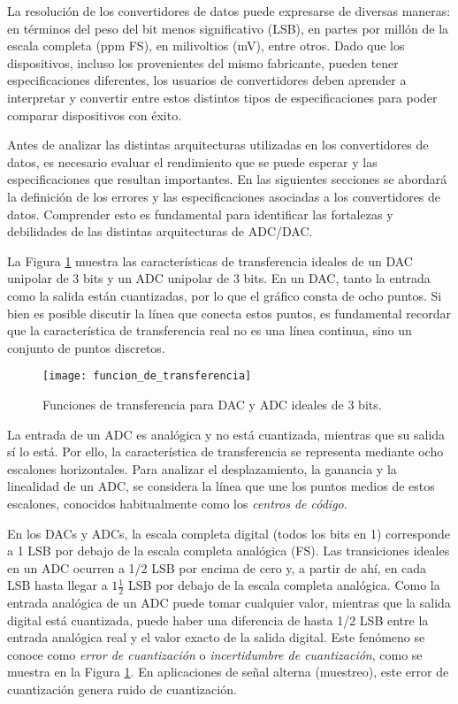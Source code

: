     La resolución de los convertidores de datos puede expresarse de diversas maneras: en términos del peso del bit menos significativo (LSB), en partes por millón de la escala completa (ppm FS), en milivoltios (mV), entre otros. Dado que los dispositivos, incluso los provenientes del mismo fabricante, pueden tener especificaciones diferentes, los usuarios de convertidores deben aprender a interpretar y convertir entre estos distintos tipos de especificaciones para poder comparar dispositivos con éxito.

    Antes de analizar las distintas arquitecturas utilizadas en los convertidores de datos, es necesario evaluar el rendimiento que se puede esperar y las especificaciones que resultan importantes. En las siguientes secciones se abordará la definición de los errores y las especificaciones asociadas a los convertidores de datos. Comprender esto es fundamental para identificar las fortalezas y debilidades de las distintas arquitecturas de ADC/DAC.

    La Figura \ref{fig:funcion_de_transferencia} muestra las características de transferencia ideales de un DAC unipolar de 3 bits y un ADC unipolar de 3 bits. En un DAC, tanto la entrada como la salida están cuantizadas, por lo que el gráfico consta de ocho puntos. Si bien es posible discutir la línea que conecta estos puntos, es fundamental recordar que la característica de transferencia real no es una línea continua, sino un conjunto de puntos discretos.

    \begin{figure}[!h]
      \centering
      \texttt{[image: funcion\_de\_transferencia]}
      \caption{Funciones de transferencia para DAC y ADC ideales de 3 bits.}
      \label{fig:funcion_de_transferencia}
    \end{figure}

    La entrada de un ADC es analógica y no está cuantizada, mientras que su salida sí lo está. Por ello, la característica de transferencia se representa mediante ocho escalones horizontales. Para analizar el desplazamiento, la ganancia y la linealidad de un ADC, se considera la línea que une los puntos medios de estos escalones, conocidos habitualmente como los \textit{centros de código}.

    En los DACs y ADCs, la escala completa digital (todos los bits en 1) corresponde a 1 LSB por debajo de la escala completa analógica (FS). Las transiciones ideales en un ADC ocurren a 1/2 LSB por encima de cero y, a partir de ahí, en cada LSB hasta llegar a $1 \frac{1}{2}$ LSB por debajo de la escala completa analógica. Como la entrada analógica de un ADC puede tomar cualquier valor, mientras que la salida digital está cuantizada, puede haber una diferencia de hasta 1/2 LSB entre la entrada analógica real y el valor exacto de la salida digital. Este fenómeno se conoce como \textit{error de cuantización} o \textit{incertidumbre de cuantización}, como se muestra en la Figura \ref{fig:funcion_de_transferencia}. En aplicaciones de señal alterna (muestreo), este error de cuantización genera ruido de cuantización.

